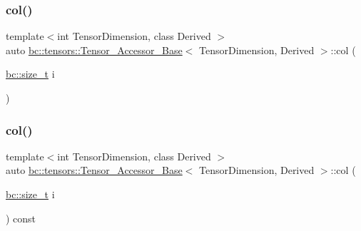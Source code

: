 \subsubsection{\texorpdfstring{col()}{col()}\hspace{0.1cm}{\footnotesize\ttfamily [1/2]}}
{\footnotesize\ttfamily template$<$int Tensor\+Dimension, class Derived $>$ \\
auto \hyperlink{classbc_1_1tensors_1_1Tensor__Accessor__Base}{bc\+::tensors\+::\+Tensor\+\_\+\+Accessor\+\_\+\+Base}$<$ Tensor\+Dimension, Derived $>$\+::col (\begin{DoxyParamCaption}\item[{\hyperlink{namespacebc_aaf8e3fbf99b04b1b57c4f80c6f55d3c5}{bc\+::size\+\_\+t}}]{i }\end{DoxyParamCaption})\hspace{0.3cm}{\ttfamily [inline]}}

\mbox{\label{classbc_1_1tensors_1_1Tensor__Accessor__Base_a129bec251f9ba41620bbf5faa4e4588b}} 
\subsubsection{\texorpdfstring{col()}{col()}\hspace{0.1cm}{\footnotesize\ttfamily [2/2]}}
{\footnotesize\ttfamily template$<$int Tensor\+Dimension, class Derived $>$ \\
auto \hyperlink{classbc_1_1tensors_1_1Tensor__Accessor__Base}{bc\+::tensors\+::\+Tensor\+\_\+\+Accessor\+\_\+\+Base}$<$ Tensor\+Dimension, Derived $>$\+::col (\begin{DoxyParamCaption}\item[{\hyperlink{namespacebc_aaf8e3fbf99b04b1b57c4f80c6f55d3c5}{bc\+::size\+\_\+t}}]{i }\end{DoxyParamCaption}) const\hspace{0.3cm}{\ttfamily [inline]}}

\mbox{\label{classbc_1_1tensors_1_1Tensor__Accessor__Base_a5f79fccfe2489d1c01594bd9f918b52a}} 
